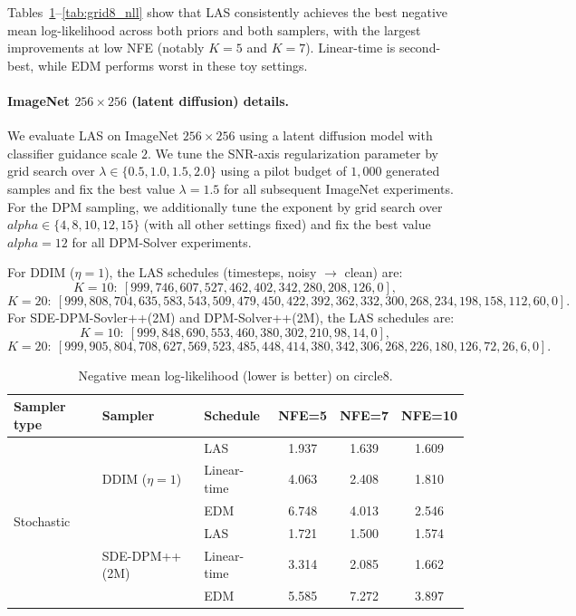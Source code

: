 \documentclass[11pt]{article}
\def\alpha{alpha}%
\def\times{×}%
\theoremstyle{definition}
\numberwithin{equation}{section}
\begin{document}
Tables~\ref{tab:circle8_nll}--\ref{tab:grid8_nll} show that LAS consistently achieves the best negative mean
log-likelihood across both priors and both samplers, with the largest improvements at low NFE (notably $K=5$
and $K=7$). Linear-time is second-best, while EDM performs worst in these toy settings.

\paragraph{ImageNet $256\times256$ (latent diffusion) details.}
We evaluate LAS on ImageNet $256\times256$ using a latent diffusion model with classifier guidance scale $2$.
We tune the SNR-axis regularization parameter by grid search over
$\lambda\in\{0.5,1.0,1.5,2.0\}$ using a pilot budget of $1{,}000$ generated samples and fix the best value
$\lambda=1.5$ for all subsequent ImageNet experiments.
For the DPM sampling, we additionally tune the exponent by grid search over
$\alpha \in\{4,8,10,12,15\}$ (with all other settings fixed) and fix the best value $\alpha=12$ for all
DPM-Solver experiments.

For DDIM ($\eta=1$), the LAS schedules (timesteps, noisy $\rightarrow$ clean) are:
\[
K=10:\ [999,746,607,527,462,402,342,280,208,126,0],
\]
\[
K=20:\ [999,808,704,635,583,543,509,479,450,422,392,362,332,300,268,234,198,158,112,60,0].
\]
For SDE-DPM-Sovler++(2M) and DPM-Solver++(2M), the LAS schedules are:
\[
K=10:\ [999,848,690,553,460,380,302,210,98,14,0],
\]
\[
K=20:\ [999,905,804,708,627,569,523,485,448,414,380,342,306,268,226,180,126,72,26,6,0].
\]


\begin{table}[t]
\centering
\caption{Negative mean log-likelihood (lower is better) on circle8.}
\label{tab:circle8_nll}
\begin{tabular}{ll|lccc}
\toprule
Sampler type & Sampler & Schedule & NFE=5 & NFE=7 & NFE=10\\
\midrule
\multirow{6}{*}{Stochastic}
 & \multirow{3}{*}{DDIM ($\eta=1$)}
 & LAS & 1.937 & 1.639 & 1.609\\
 &  & Linear-time & 4.063 & 2.408 & 1.810\\
 &  & EDM  & 6.748 & 4.013 & 2.546\\
\cmidrule(lr){2-6}
 & \multirow{3}{*}{SDE-DPM++(2M)}
 & LAS& 1.721 & 1.500 & 1.574\\
 &  & Linear-time & 3.314 & 2.085 & 1.662\\
 &  & EDM & 5.585 & 7.272 & 3.897\\
\bottomrule
\end{tabular}
\end{table}
\end{document}
